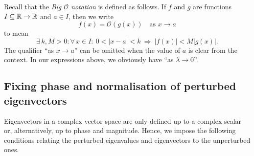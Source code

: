 \begin{remark}
Recall that the \emph{Big $\mathcal{O}$ notation} is defined as follows. If $f$ and $g$ are functions $I\subseteq\mathbb{R}\to\mathbb{R}$ and $a\in I$, then we write
\begin{equation*}
f(x)=\mathcal{O}(g(x)) \quad \text{as }x\to a
\end{equation*}
to mean
\begin{equation*}
\exists \, k,M>0 : \forall \, x\in I : \ 0<|x-a|<k \ \Rightarrow \ |f(x)|<M|g(x)|.
\end{equation*}
The qualifier ``as $x\to a$'' can be omitted when the value of $a$ is clear from the context. In our expressions above, we obviously have ``as $\lambda \to 0$''.
\end{remark}

\subsection{Fixing phase and normalisation of perturbed eigenvectors}

Eigenvectors in a complex vector space are only defined up to a complex scalar or, alternatively, up to phase and magnitude. Hence, we impose the following conditions relating the perturbed eigenvalues and eigenvectors to the unperturbed ones.

